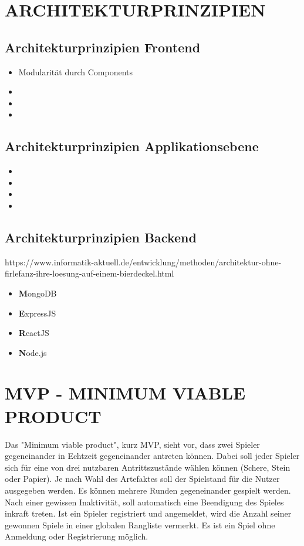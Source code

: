 \documentclass[conference]{IEEEtran}
\begin{document}
\begin{itemize}
\section{ARCHITEKTURPRINZIPIEN}
\subsection{Architekturprinzipien Frontend}
\begin{itemize}
    \item Modularität durch Components
    \item 
    \item 
    \item 
\end{itemize}
\subsection{Architekturprinzipien Applikationsebene}
\begin{itemize}
    \item 
    \item 
    \item
    \item
\end{itemize}
\subsection{Architekturprinzipien Backend}
https://www.informatik-aktuell.de/entwicklung/methoden/architektur-ohne-firlefanz-ihre-loesung-auf-einem-bierdeckel.html

\begin{itemize}
    \item \textbf {M}ongoDB
    \item \textbf {E}xpressJS
    \item \textbf {R}eactJS
    \item \textbf {N}ode.js
\end{itemize}



\section{MVP - MINIMUM VIABLE PRODUCT}
Das "Minimum viable product", kurz MVP, sieht vor, dass zwei Spieler gegeneinander in Echtzeit gegeneinander antreten können. Dabei soll jeder Spieler sich für eine von drei nutzbaren Antrittszustände wählen können (Schere, Stein oder Papier). Je nach Wahl des Artefaktes soll der Spielstand für die Nutzer ausgegeben werden. Es können mehrere Runden gegeneinander gespielt werden.
Nach einer gewissen Inaktivität, soll automatisch eine Beendigung des Spieles inkraft treten.
Ist ein Spieler registriert und angemeldet, wird die Anzahl seiner gewonnen Spiele in einer globalen Rangliste vermerkt. Es ist ein Spiel ohne Anmeldung oder Registrierung möglich.



\end{itemize}
\end{document}

